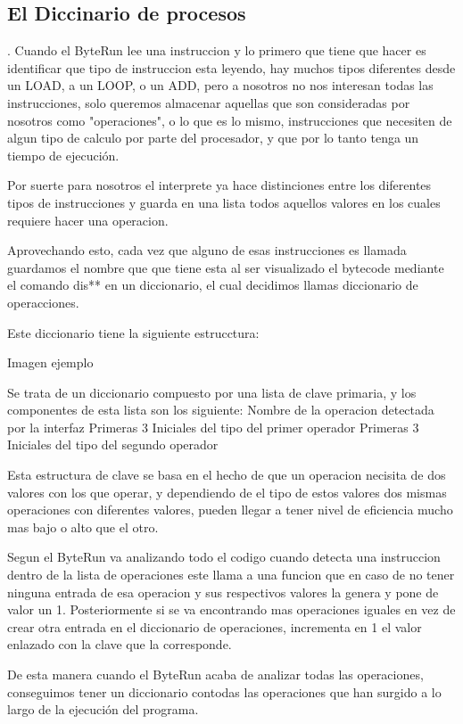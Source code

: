 \subsection{El Diccinario de procesos}.
Cuando el ByteRun lee una instruccion y lo primero que tiene que hacer es identificar que tipo de instruccion esta leyendo, hay muchos tipos diferentes desde un LOAD, a un LOOP, o un ADD, pero a nosotros no nos interesan todas las instrucciones, solo queremos almacenar aquellas que son consideradas por nosotros como "operaciones", o lo que es lo mismo, instrucciones que necesiten de algun tipo de calculo por parte del procesador, y que por lo tanto tenga un tiempo de ejecución.

Por suerte para nosotros el interprete ya hace distinciones entre los diferentes tipos de instrucciones y guarda en una lista todos aquellos valores en los cuales requiere hacer una operacion.

Aprovechando esto, cada vez que alguno de esas instrucciones es llamada guardamos el nombre que que tiene esta al ser visualizado el bytecode mediante el comando dis** en un diccionario, el cual decidimos llamas diccionario de operacciones.

Este diccionario tiene la siguiente estrucctura:

Imagen ejemplo

Se trata de un diccionario compuesto por una lista de clave primaria, y los componentes de esta lista son los siguiente:
Nombre de la operacion detectada por la interfaz
Primeras 3 Iniciales del tipo del primer operador 
Primeras 3 Iniciales del tipo del segundo operador 

Esta estructura de clave se basa en el hecho de que un operacion necisita de dos valores con los que operar, y dependiendo de el tipo de estos valores dos mismas operaciones con diferentes valores, pueden llegar a tener nivel de eficiencia mucho mas bajo o alto que el otro. 

Segun el ByteRun va analizando todo el codigo cuando detecta una instruccion dentro de la lista de operaciones este llama a una funcion que en caso de  no tener ninguna entrada de esa operacion y sus respectivos valores la genera y pone de valor un 1. Posteriormente si se va encontrando mas operaciones iguales en vez de  crear otra entrada en el diccionario de operaciones, incrementa en 1 el valor enlazado con la clave que la corresponde.

De esta manera cuando el ByteRun acaba de analizar todas las operaciones, conseguimos tener un diccionario contodas las operaciones que han surgido a lo largo de la ejecución del programa.

